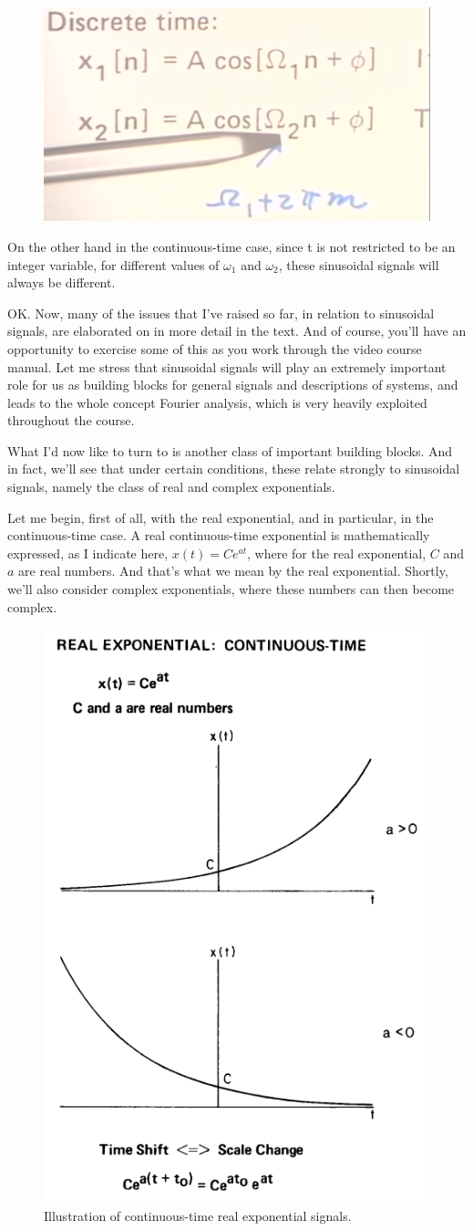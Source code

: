 \documentclass[fleqn,10pt]{olplainarticle}
\theoremstyle{definition}
\theoremstyle{remark}
\begin{document}
\begin{figure}[ht]
	\centering
	\includegraphics[width=0.3\linewidth]{images/signals_14.png}
	\caption{}
	\label{fig:signals_14}
\end{figure}

On the other hand in the continuous-time case, since t is not restricted to be an integer variable, for different values of $\omega_1$ and $\omega_2$, these sinusoidal signals will always be different.

OK. Now, many of the issues that I've raised so far, in relation to sinusoidal signals, are elaborated on in more detail in the text. And of course, you'll have an opportunity to exercise some of this as you work through the video course manual. Let me stress that sinusoidal signals will play an extremely important role for us as building blocks for general signals and descriptions of systems, and leads to the whole concept Fourier analysis, which is very heavily exploited throughout the course.

What I'd now like to turn to is another class of important building blocks. And in fact, we'll see that under certain conditions, these relate strongly to sinusoidal signals, namely the class of real and complex exponentials.

Let me begin, first of all, with the real exponential, and in particular, in the continuous-time case. A real continuous-time exponential is mathematically expressed, as I indicate here, $x(t) = Ce^{at}$, where for the real exponential, $C$ and $a$ are real numbers. And that's what we mean by the real exponential. Shortly, we'll also consider complex exponentials, where these numbers can then become complex.

\begin{figure}[ht]
	\centering
	\includegraphics[width=0.5\linewidth]{images/signals_15.png}
	\caption{Illustration of continuous-time real exponential signals.}
	\label{fig:signals_15}
\end{figure}
\end{document}
